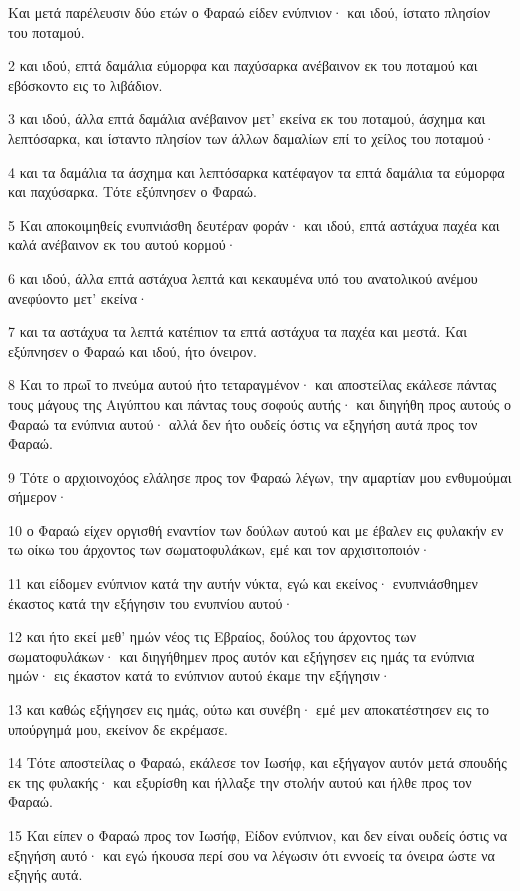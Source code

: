 \par Και μετά παρέλευσιν δύο ετών ο Φαραώ είδεν ενύπνιον· και ιδού, ίστατο πλησίον του ποταμού.
\par 2 και ιδού, επτά δαμάλια εύμορφα και παχύσαρκα ανέβαινον εκ του ποταμού και εβόσκοντο εις το λιβάδιον.
\par 3 και ιδού, άλλα επτά δαμάλια ανέβαινον μετ' εκείνα εκ του ποταμού, άσχημα και λεπτόσαρκα, και ίσταντο πλησίον των άλλων δαμαλίων επί το χείλος του ποταμού·
\par 4 και τα δαμάλια τα άσχημα και λεπτόσαρκα κατέφαγον τα επτά δαμάλια τα εύμορφα και παχύσαρκα. Τότε εξύπνησεν ο Φαραώ.
\par 5 Και αποκοιμηθείς ενυπνιάσθη δευτέραν φοράν· και ιδού, επτά αστάχυα παχέα και καλά ανέβαινον εκ του αυτού κορμού·
\par 6 και ιδού, άλλα επτά αστάχυα λεπτά και κεκαυμένα υπό του ανατολικού ανέμου ανεφύοντο μετ' εκείνα·
\par 7 και τα αστάχυα τα λεπτά κατέπιον τα επτά αστάχυα τα παχέα και μεστά. Και εξύπνησεν ο Φαραώ και ιδού, ήτο όνειρον.
\par 8 Και το πρωΐ το πνεύμα αυτού ήτο τεταραγμένον· και αποστείλας εκάλεσε πάντας τους μάγους της Αιγύπτου και πάντας τους σοφούς αυτής· και διηγήθη προς αυτούς ο Φαραώ τα ενύπνια αυτού· αλλά δεν ήτο ουδείς όστις να εξηγήση αυτά προς τον Φαραώ.
\par 9 Τότε ο αρχιοινοχόος ελάλησε προς τον Φαραώ λέγων, την αμαρτίαν μου ενθυμούμαι σήμερον·
\par 10 ο Φαραώ είχεν οργισθή εναντίον των δούλων αυτού και με έβαλεν εις φυλακήν εν τω οίκω του άρχοντος των σωματοφυλάκων, εμέ και τον αρχισιτοποιόν·
\par 11 και είδομεν ενύπνιον κατά την αυτήν νύκτα, εγώ και εκείνος· ενυπνιάσθημεν έκαστος κατά την εξήγησιν του ενυπνίου αυτού·
\par 12 και ήτο εκεί μεθ' ημών νέος τις Εβραίος, δούλος του άρχοντος των σωματοφυλάκων· και διηγήθημεν προς αυτόν και εξήγησεν εις ημάς τα ενύπνια ημών· εις έκαστον κατά το ενύπνιον αυτού έκαμε την εξήγησιν·
\par 13 και καθώς εξήγησεν εις ημάς, ούτω και συνέβη· εμέ μεν αποκατέστησεν εις το υπούργημά μου, εκείνον δε εκρέμασε.
\par 14 Τότε αποστείλας ο Φαραώ, εκάλεσε τον Ιωσήφ, και εξήγαγον αυτόν μετά σπουδής εκ της φυλακής· και εξυρίσθη και ήλλαξε την στολήν αυτού και ήλθε προς τον Φαραώ.
\par 15 Και είπεν ο Φαραώ προς τον Ιωσήφ, Είδον ενύπνιον, και δεν είναι ουδείς όστις να εξηγήση αυτό· και εγώ ήκουσα περί σου να λέγωσιν ότι εννοείς τα όνειρα ώστε να εξηγής αυτά.
